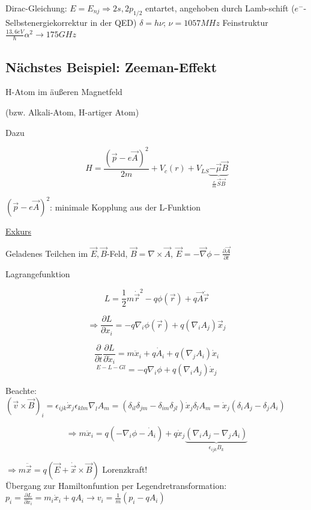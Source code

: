 Dirac-Gleichung: \(E=E_{nj}\Rightarrow 2s,2p_{1/2}\) entartet, angehoben durch Lamb-schift (\(e^-\)-Selbstenergiekorrektur in der QED) \(\delta = h\nu\); \(\nu = 1057MHz\) Feinstruktur \(\frac{13,6eV}{\hbar}\alpha^2\rightarrow 175GHz\)



\subsection{Nächstes Beispiel: Zeeman-Effekt}


H-Atom im äußeren Magnetfeld

(bzw. Alkali-Atom, H-artiger Atom)

Dazu

\[ H=\frac{(\vec p-e\vec A)^2}{2m}+V_c(r)+V_{LS}\underbrace{-\vec \mu\vec B}_{\frac{e}{m}\vec S\vec B}\]

\((\vec p-e\vec A)^2\): minimale Kopplung aus der L-Funktion
\newline

\underline{Exkurs}

Geladenes Teilchen im \(\vec E,\vec B\)-Feld, \(\vec B = \nabla \times \vec A\), \(\vec E = -\vec \nabla \phi - \frac{\partial \vec A}{\partial t}\)

Lagrangefunktion

\[ L = \frac{1}{2} m \dot {\vec r}^2 - q\phi(\vec r) + q\vec A\dot{\vec r}\]

\[\Rightarrow \frac{\partial L}{\partial x_i}=-q\nabla_i\phi(\vec r) + q(\nabla_iA_j)\vec x_j\]

\[ \frac{\partial}{\partial t}\frac{\partial L}{\partial \dot x_i} = m\ddot x_i + q \dot A_i + q(\nabla_jA_i)\dot x_i\]
\[ ^{E-L-Gl}= -q\nabla_i\phi+q(\nabla_iA_j)\dot x_j\]

Beachte: \((\vec v\times \vec B)_i = \epsilon_{ijk}\dot x_j \epsilon_{klm}\nabla_lA_m = (\delta_{il}\delta_{jm}-\delta_{im}\delta_{jl})\dot x_j\delta_lA_m = \dot x_j(\delta_iA_j - \delta_jA_i)\)


\[\Rightarrow m\ddot x_i = q(-\nabla_i\phi - \dot A_i)+q\dot x_j\underbrace{(\nabla_iA_j-\nabla_jA_i)}_{\epsilon_{ijk}B_k}\]


\(\Rightarrow m\ddot{\vec x} = q(\vec E + \dot{\vec x} \times \vec B)\) Lorenzkraft!
\\
Übergang zur Hamiltonfuntion per Legendretransformation:
\\
\(p_i = \frac{\partial L}{\partial \dot x_i} = m_i \dot x_i + q A_i \rightarrow v_i = \frac{1}{m}(p_i-qA_i)\)


